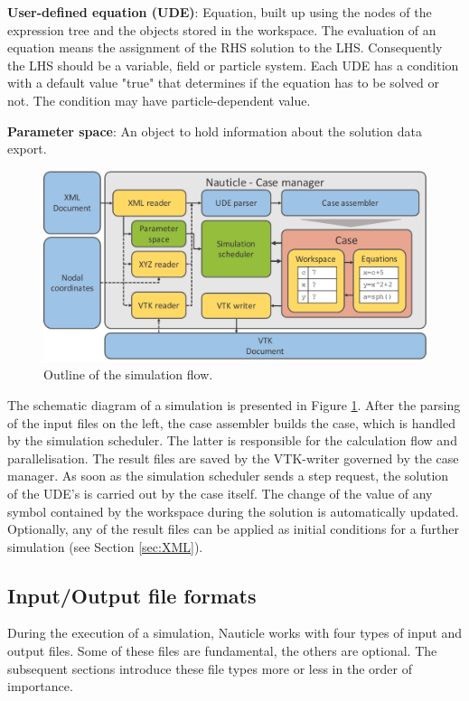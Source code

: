 \documentclass[a4paper,12pt,openany]{book}
\theoremstyle{break}
\begin{document}
\textbf{User-defined equation (UDE)}: Equation, built up using the nodes of the expression tree and the objects stored in the workspace. The evaluation of an equation means the assignment of the RHS solution to the LHS. Consequently the LHS should be a variable, field or particle system. Each UDE has a condition with a default value "true" that determines if the equation has to be solved or not. The condition may have particle-dependent value.

\textbf{Parameter space}: An object to hold information about the solution data export.

\begin{figure}[h!]
  \includegraphics[scale=0.55]{workflow.pdf}
  \centering
  \caption{Outline of the simulation flow.}
  \label{fig:workflow}
\end{figure}\vspace*{3pt}

The schematic diagram of a simulation is presented in Figure \ref{fig:workflow}. After the parsing of the input files on the left, the case assembler builds the case, which is handled by the simulation scheduler. The latter is responsible for the calculation flow and parallelisation. The result files are saved by the VTK-writer governed by the case manager. 
As soon as the simulation scheduler sends a step request, the solution of the UDE's is carried out by the case itself. The change of the value of any symbol contained by the workspace during the solution is automatically updated. Optionally, any of the result files can be applied as initial conditions for a further simulation (see Section \ref{sec:XML}).

\subsection{Input/Output file formats}
During the execution of a simulation, Nauticle works with four types of input and output files. Some of these files are fundamental, the others are optional. The subsequent sections introduce these file types more or less in the order of importance.
\end{document}

